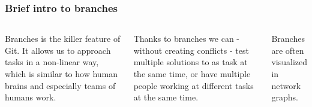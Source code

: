 \documentclass[aspectratio=169]{beamer} %
\begin{document}
\begin{frame}
	\frametitle{Brief intro to branches}
	\begin{columns}[c]
		
		
		Branches is the killer feature of Git. 
		It allows us to approach tasks in a non-linear way,
		which is similar to how human brains
		and especially teams of humans work.
		\vspace{1.5em}	

		Thanks to branches we can - without creating conflicts -
		test multiple solutions to as task at the same time, or 
		have multiple people working at different tasks at the same time.
		\vspace{1.5em}
			
		Branches are often visualized in network graphs.
		
		

\end{columns}
\end{frame}
\end{document}
